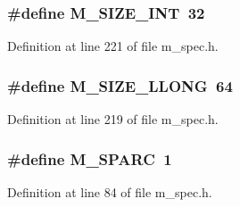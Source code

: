 \subsubsection{\setlength{\rightskip}{0pt plus 5cm}\#define M\_\-SIZE\_\-INT~32}\label{m__spec_8h_63aacff4a1511a06cfbb1cd06148ba41}




Definition at line 221 of file m\_\-spec.h.
\subsubsection{\setlength{\rightskip}{0pt plus 5cm}\#define M\_\-SIZE\_\-LLONG~64}\label{m__spec_8h_1d6fb38dde929664653ee70be20c799e}




Definition at line 219 of file m\_\-spec.h.
\subsubsection{\setlength{\rightskip}{0pt plus 5cm}\#define M\_\-SPARC~1}\label{m__spec_8h_b5a55f3bddcf9816aeaafc8279597cbf}




Definition at line 84 of file m\_\-spec.h.

